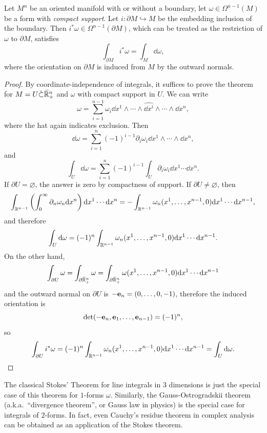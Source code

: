 \begin{thm}
    Let $M^n$ be an oriented manifold with or without a boundary, let $\omega\in \Omega^{n-1}(M)$ be a form with \emph{compact support}. Let $i:\partial M\hookrightarrow M$ be the embedding inclusion of the boundary. Then $i^\ast\omega\in\Omega^{n-1}(\partial M)$, which can be treated as the restriction of $\omega$  to $\partial M$, satisfies
    \[\int_{\partial M}i^\ast \omega=\int_M \dd \omega,\]
    where the orientation on $\partial M$ is induced from $M$ by the outward normals.
\end{thm}
\begin{proof}
    By coordinate-independence of integrals, it suffices to prove the theorem for $M=U\mathring\subset \wb\bbR^n_+$ and $\omega$ with compact support in $U$. We can write
    \[\omega=\sum_{i=1}^{n-1}\omega_i \dd x^1\wedge\cdots \wedge \widehat{\dd x^i}\wedge \cdots\wedge \dd x^n,\]
    where the hat again indicates exclusion. Then
    \[\dd \omega=\sum_{i=1}^n (-1)^{i-1}\partial_i\omega_i \dd x^1\wedge\cdots\wedge\dd x^n,\]
    and 
    \[\int_U \dd\omega=\sum_{i=1}^n(-1)^{i-1}\int_U \partial_i\omega_i\dd x^1\cdots\dd x^n.\]
    If $\partial U=\varnothing$, the answer is zero by compactness of support. If $\partial U\neq\varnothing$, then
    \[\int_{\bbR^{n-1}}\left(\int_0^\infty \partial_n\omega_n\dd x^n\right)\dd x^1\cdots\dd x^n=-\int_{\bbR^{n-1}}\omega_n(x^1,\ldots,x^{n-1},0)\dd x^1\cdots\dd x^{n-1},\]
    and therefore 
    \[\int_U \dd\omega=(-1)^n\int_{\bbR^{n-1}}\omega_n(x^1,\ldots,x^{n-1},0)\dd x^1\cdots\dd x^{n-1}.\]
    On the other hand, 
    \[\int_{\partial U}\omega=\int_{\partial \wb\bbR^n_+}\omega=\int_{\partial \wb\bbR^n_+}\omega(x^1,\ldots,x^{n-1},0)\dd x^1\cdots \dd x^{n-1}\] 
    and the outward normal on $\partial U$ is $-\bf{e}_n=(0,\ldots,0,-1)$, therefore the induced orientation is 
    \[\det(-\bf{e}_n,\bf{e}_1,\ldots,\bf{e}_{n-1})=(-1)^n,\] 
    so
    \[\int_{\partial U}i^\ast\omega=(-1)^{n}\int_{\bbR^{n-1}}\omega_n(x^1,\ldots,x^{n-1},0)\dd x^1\cdots\dd x^{n-1}=\int_U \dd\omega.\]
\end{proof}
\begin{rem}
    The classical Stokes' Theorem for line integrals in $3$ dimensions is just the special case of this theorem for $1$-forms $\omega$. Similarly, the Gauss-Ostrogradskii theorem (a.k.a.\ ``divergence theorem'', or Gauss law in physics) is the special case for integrals of $2$-forms. In fact, even Cauchy's residue theorem in complex analysis can be obtained as an application of the Stokes theorem.
\end{rem}

